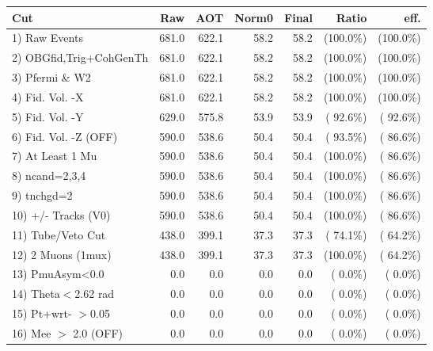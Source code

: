  \begin{table}[h!]\centering
 \begin{tabular}{||l||r|r|r|r|r|r||}
 \hline
 \hline
 Cut & Raw & AOT & Norm0 & Final & Ratio & eff.       \\
 \hline
  1) Raw Events           &        681.0 &        622.1 &         58.2 &         58.2 & (100.0\%) & (100.0\%) \\
  2) OBGfid,Trig+CohGenTh &        681.0 &        622.1 &         58.2 &         58.2 & (100.0\%) & (100.0\%) \\
  3) Pfermi \& W2         &        681.0 &        622.1 &         58.2 &         58.2 & (100.0\%) & (100.0\%) \\
  4) Fid. Vol. -X         &        681.0 &        622.1 &         58.2 &         58.2 & (100.0\%) & (100.0\%) \\
  5) Fid. Vol. -Y         &        629.0 &        575.8 &         53.9 &         53.9 & ( 92.6\%) & ( 92.6\%) \\
  6) Fid. Vol. -Z (OFF)   &        590.0 &        538.6 &         50.4 &         50.4 & ( 93.5\%) & ( 86.6\%) \\
  7) At Least 1 Mu        &        590.0 &        538.6 &         50.4 &         50.4 & (100.0\%) & ( 86.6\%) \\
  8) ncand=2,3,4          &        590.0 &        538.6 &         50.4 &         50.4 & (100.0\%) & ( 86.6\%) \\
  9) tnchgd=2             &        590.0 &        538.6 &         50.4 &         50.4 & (100.0\%) & ( 86.6\%) \\
 10) +/- Tracks (V0)      &        590.0 &        538.6 &         50.4 &         50.4 & (100.0\%) & ( 86.6\%) \\
 11) Tube/Veto Cut        &        438.0 &        399.1 &         37.3 &         37.3 & ( 74.1\%) & ( 64.2\%) \\
 12) 2 Muons (1mux)       &        438.0 &        399.1 &         37.3 &         37.3 & (100.0\%) & ( 64.2\%) \\
 13) PmuAsym<0.0          &          0.0 &          0.0 &          0.0 &          0.0 & (  0.0\%) & (  0.0\%) \\
 14) Theta$<$2.62 rad     &          0.0 &          0.0 &          0.0 &          0.0 & (  0.0\%) & (  0.0\%) \\
 15) Pt+wrt- $>$0.05      &          0.0 &          0.0 &          0.0 &          0.0 & (  0.0\%) & (  0.0\%) \\
 16) Mee $>$ 2.0  (OFF)   &          0.0 &          0.0 &          0.0 &          0.0 & (  0.0\%) & (  0.0\%) \\

\end{tabular}
\end{table}

